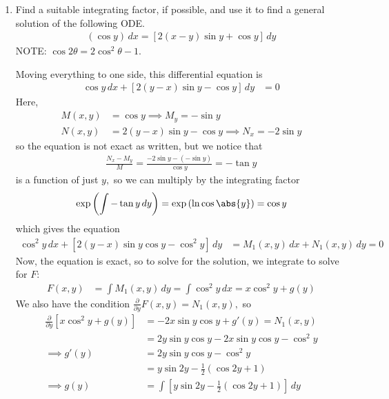 \documentclass{article}
\begin{document}
\begin{enumerate}
		\newpage
	\item Find a suitable integrating factor, if possible, and use it to find a general solution of the following ODE.
		\begin{align*}
			(\cos y)\, dx = \left[ 2(x-y)\sin y + \cos y \right]\, dy
		\end{align*}
		NOTE: $\cos 2\theta = 2\cos^2\theta-1.$
		\begin{soln}
			Moving everything to one side, this differential equation is
			\begin{align*}
				\cos y\, dx + \left[ 2(y-x)\sin y - \cos y \right]\, dy &= 0
			\end{align*}
			Here,
			\begin{align*}
				M(x, y) &= \cos y \implies M_y = -\sin y \\
				N(x, y) &= 2(y-x)\sin y - \cos y \implies N_x = -2\sin y
			\end{align*}
			so the equation is not exact as written, but we notice that
			\begin{align*}
				\frac{N_x-M_y}{M} = \frac{-2\sin y -(-\sin y)}{\cos y} = -\tan y
			\end{align*}
			is a function of just $y,$ so we can multiply by the integrating factor
			\begin{align*}
				\exp\left( \int -\tan y\, dy \right) = \exp\left( \ln \cos\abs{y} \right) = \cos y
			\end{align*}
			which gives the equation
			\begin{align*}
				\cos^2 y \, dx + \left[ 2(y-x)\sin y\cos y - \cos ^2 y \right]\, dy &= M_1(x, y)\, dx + N_1(x, y)\, dy = 0
			\end{align*}
			Now, the equation is exact, so to solve for the solution, we integrate to solve for $F:$
			\begin{align*}
				F(x, y) &= \int M_1(x, y)\, dy = \int \cos^2y\, dx = x\cos^2y + g(y)
			\end{align*}
			We also have the condition $\frac{\partial}{\partial y} F(x, y) = N_1(x, y),$ so
			\begin{align*}
				\frac{\partial}{\partial y} \left[ x\cos^2 y + g(y) \right] &= -2x\sin y\cos y + g'(y) = N_1(x, y) \\
				&= 2y\sin y\cos y - 2x\sin y \cos y - \cos^2 y \\
				\implies g'(y) &= 2y\sin y\cos y - \cos^2 y \\
				&= y\sin 2y - \frac{1}{2}(\cos 2y + 1) \\
				\implies g(y) &= \int \left[ y\sin 2y - \frac{1}{2}(\cos 2y + 1) \right]\, dy \\

\end{align*}
\end{soln}
\end{enumerate}
\end{document}
